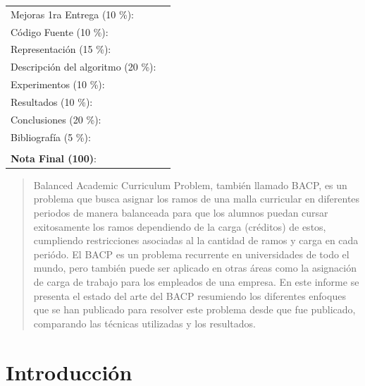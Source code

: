 \documentclass[letterpaper,10pt]{article}
\begin{document}
\begin{tabular}{ll}
Mejoras 1ra Entrega (10 \%):  & \underline{\hspace{2cm}}\tabularnewline
Código Fuente (10 \%):  & \underline{\hspace{2cm}}\tabularnewline
Representación (15 \%):  & \underline{\hspace{2cm}} \tabularnewline
Descripción del algoritmo (20 \%):  & \underline{\hspace{2cm}} \tabularnewline
Experimentos (10 \%):  & \underline{\hspace{2cm}} \tabularnewline
Resultados (10 \%):  & \underline{\hspace{2cm}} \tabularnewline
Conclusiones (20 \%):  & \underline{\hspace{2cm}}\tabularnewline
Bibliograf\'{i}a (5 \%):  & \underline{\hspace{2cm}}\tabularnewline
 & \tabularnewline
\textbf{Nota Final (100)}:  & \underline{\hspace{2cm}} \tabularnewline
\end{tabular}%
\vspace{2cm}
\begin{abstract}
Balanced Academic Curriculum Problem, también llamado BACP,
es un problema que busca asignar los ramos de una malla curricular
en diferentes periodos de manera balanceada para que los alumnos
puedan cursar exitosamente los ramos dependiendo de la carga (cr\'editos)
de estos, cumpliendo restricciones asociadas al la cantidad de ramos y
carga en cada periódo. El BACP es un problema recurrente en universidades
de todo el mundo, pero tambi\'en puede ser aplicado en otras áreas
como la asignación de carga de trabajo para los empleados de una
empresa. En este informe se presenta el estado del arte del BACP
resumiendo los diferentes enfoques que se han publicado para
resolver este problema desde que fue publicado, comparando
las t\'ecnicas utilizadas y los resultados.

\end{abstract}

\section{Introducción}
\end{document}
